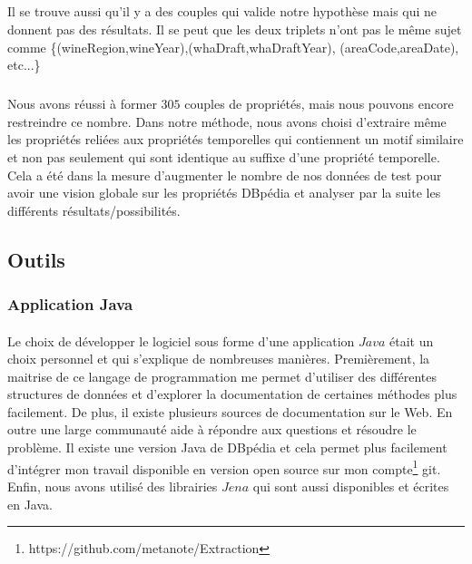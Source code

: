 \documentclass[12pt,a4	]{report}
\begin{document}
\subparagraph{}
Il se trouve aussi qu'il y a des couples qui valide notre hypothèse mais qui ne donnent pas des résultats. Il se peut que les deux triplets n'ont pas le même sujet comme \{(wineRegion,wineYear),(whaDraft,whaDraftYear),
(areaCode,areaDate), etc...\}
\subparagraph{}
Nous avons réussi à former $305$ couples de propriétés, mais nous pouvons encore restreindre ce nombre. Dans notre méthode, nous avons choisi d'extraire même les propriétés reliées aux propriétés temporelles qui contiennent un motif similaire et non pas seulement qui sont identique au suffixe d'une propriété temporelle. Cela a été dans la mesure d'augmenter le nombre de nos données de test pour avoir une vision globale sur les propriétés DBpédia et analyser par la suite les différents résultats/possibilités. 
\subsection*{Outils}
\subsubsection*{Application Java}
\paragraph{}
Le choix de développer le logiciel sous forme d'une application $Java$ était un choix personnel et qui s'explique de nombreuses manières. Premièrement, la maitrise de ce langage de programmation me permet d'utiliser des différentes structures de données et d'explorer la documentation de certaines méthodes plus facilement. De plus, il existe plusieurs sources de documentation sur le Web. En outre une large communauté aide à répondre aux questions et résoudre le problème. Il existe une version Java de DBpédia et cela permet plus facilement d'intégrer mon travail disponible en version open source sur mon compte\footnote{https://github.com/metanote/Extraction} git. Enfin, nous avons utilisé des librairies $Jena$ qui sont aussi disponibles et écrites en Java. 
\end{document}
